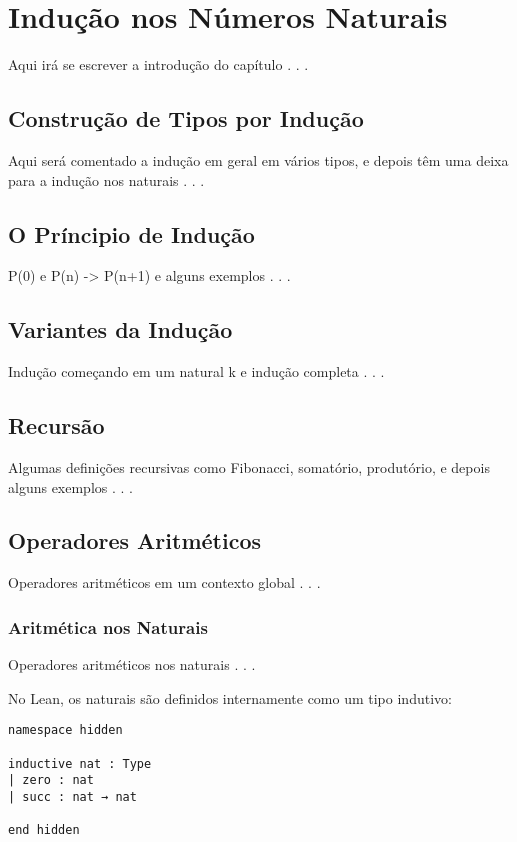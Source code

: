 \chapter{Indução nos Números Naturais}

Aqui irá se escrever a introdução do capítulo . . . 

\section{Construção de Tipos por Indução}

Aqui será comentado a indução em geral em vários tipos, e depois têm uma deixa para a indução nos naturais . . .

\section{O Príncipio de Indução}

P(0) e P(n) -> P(n+1) e alguns exemplos . . .

\section{Variantes da Indução}

Indução começando em um natural k e indução completa . . .

\section{Recursão}

Algumas definições recursivas como Fibonacci, somatório, produtório, e depois alguns exemplos . . .

\section{Operadores Aritméticos}

Operadores aritméticos em um contexto global . . .

\subsection{Aritmética nos Naturais}

Operadores aritméticos nos naturais . . .

No Lean, os naturais são definidos internamente como um tipo indutivo:

\begin{lstlisting}
namespace hidden

inductive nat : Type
| zero : nat
| succ : nat → nat

end hidden
\end{lstlisting}

